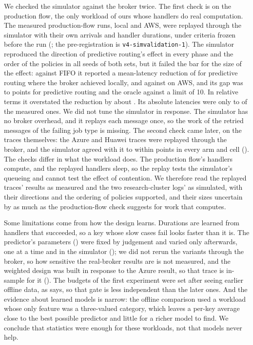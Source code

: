 We checked the simulator against the broker twice. The first check is on the production flow, the only workload of ours whose handlers do real computation. The measured production-flow runs, local and AWS, were replayed through the simulator with their own arrivals and handler durations, under criteria frozen before the run (; the pre-registration is \texttt{v4-simvalidation-1}). The simulator reproduced the direction of predictive routing's effect in every phase and the order of the policies in all \SimValSeedsGroupOrder{} seeds of both sets, but it failed the bar for the size of the effect: against FIFO it reported a mean-latency reduction of \SimValPredLocalSim{} for predictive routing where the broker achieved \SimValPredLocalReal{} locally, and \SimValPredAWSSim{} against \SimValPredAWSReal{} on AWS, and its gap was \SimValGapMin{} to \SimValGapMax{} points for predictive routing and the oracle against a limit of 10. In relative terms it overstated the reduction by about \SimValOverstatePct{}. Its absolute latencies were only \SimValRatioMin{} to \SimValRatioMax{} of the measured ones. We did not tune the simulator in response. The simulator has no broker overhead, and it replays each message once, so the work of the retried messages of the failing job type is missing. The second check came later, on the traces themselves: the Azure and Huawei traces were replayed through the broker, and the simulator agreed with it to within \SimReplayGapMax{} points in every arm and cell (). The checks differ in what the workload does. The production flow's handlers compute, and the replayed handlers sleep, so the replay tests the simulator's queueing and cannot test the effect of contention. We therefore read the replayed traces' results as measured and the two research-cluster logs' as simulated, with their directions and the ordering of policies supported, and their sizes uncertain by as much as the production-flow check suggests for work that computes.

Some limitations come from how the design learns. Durations are learned from handlers that succeeded, so a key whose
slow cases fail looks faster than it is. The predictor's parameters () were fixed by judgement and varied only afterwards, one at a time and in the simulator (); we did not rerun the variants through the broker, so how sensitive the real-broker results are is not measured, and the weighted design was built in response to the Azure result, so that trace is in-sample for it (). The budgets of the first experiment were set after seeing earlier offline
data, as  says, so that gate is less independent than the later ones. And the evidence about
learned models is narrow: the offline comparison used a workload whose only feature was a three-valued category, which
leaves a per-key average close to the best possible predictor and little for a richer model to find. We conclude that
statistics were enough for these workloads, not that models never help.


